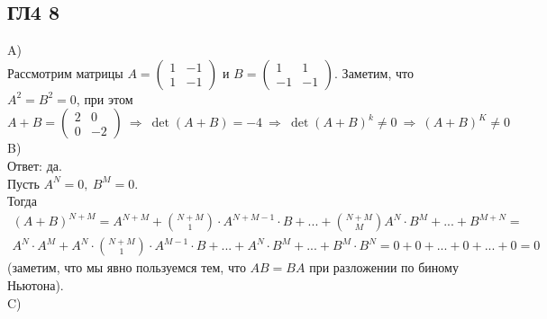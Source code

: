 		\subsection{ГЛ4 8}
		A)\\
		Рассмотрим матрицы $A = \begin{pmatrix} 1 & -1 \\ 1 & -1 \end{pmatrix}$ и $B = \begin{pmatrix} 1 & 1 \\ -1 & -1 \end{pmatrix}$. Заметим, что $A^2 = B^2 = 0$, при этом $A + B = \begin{pmatrix} 2 & 0 \\ 0 & -2 \end{pmatrix} \ \Rightarrow \ \det(A + B) = -4 \ \Rightarrow \ \det(A+B)^k \ne 0 \ \Rightarrow \ (A+B)^K \ne 0$
		\\
		B)\\
		Ответ: да.\\
		Пусть $A^N = 0,\ B^M = 0$.\\
		Тогда 
		\begin{gather*}
			(A + B)^{N+M} = 
			A^{N+M} + {N+M \choose 1} 
			\cdot A^{N+M-1} \cdot B + ... + {N+M \choose M} 
			A^N \cdot B^M + ... + B^{M+N} 
			=\\
			A^N \cdot A^M + A^N \cdot {N+M \choose 1}
			\cdot A^{M-1} \cdot B + ... + A^N \cdot B^M + ... + B^M \cdot B^N
			=
			0 + 0 + ... + 0 + ... + 0 = 0
		\end{gather*}
		(заметим, что мы явно пользуемся тем, что $AB = BA$ при разложении по биному Ньютона).
		\\
		C)\\
		\\

